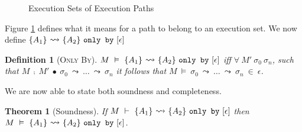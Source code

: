\documentclass[12pt]{article}
\newcommand\trans[1]{\overset{#1}{\mathlarger{\mathlarger \leadsto}}}
\newcommand\mut[3]{#1\ \texttt{mut}\ #2.#3}
\newcommand\gives[3]{#1\ \texttt{gives}\ #2\ \texttt{to}\ #3}
\newcommand\onlyBy[3]{\{#1\}\ \trans{}\ \{#2\}\ \texttt{only by}\ [#3]}
\newtheorem{definition}{Definition}
\newtheorem{theorem}{Theorem}
\begin{document}
\begin{figure}[h]
\footnotesize
{}
\caption{Execution Sets of Execution Paths}
\label{f:effect_path}
\end{figure}
Figure \ref{f:effect_path} defines what it means for a path to belong to an execution set.
We now define $\onlyBy{A_1}{A_2}{\epsilon}$
\begin{definition}[\textsc{Only By}]
$M\ \vDash\ \onlyBy{A_1}{A_2}{\epsilon}$ 
iff 
$\forall\ M'\ \sigma_0\ \sigma_n$, 
such that
$M\ \fcmp\ M'\ \bullet\ \sigma_0\ \leadsto\ \ldots\ \leadsto\ \sigma_n$
it follows that 
$M\ \vDash\ \sigma_0\ \leadsto\ \ldots\ \leadsto\ \sigma_n\ \in\ \epsilon$.
\end{definition}
We are now able to state both soundness and completeness.
\begin{theorem}[Soundness]
If $M\ \vdash\ \onlyBy{A_1}{A_2}{\epsilon}$ then 
$M\ \vDash\ \onlyBy{A_1}{A_2}{\epsilon}$.
\end{theorem}
\end{document}
